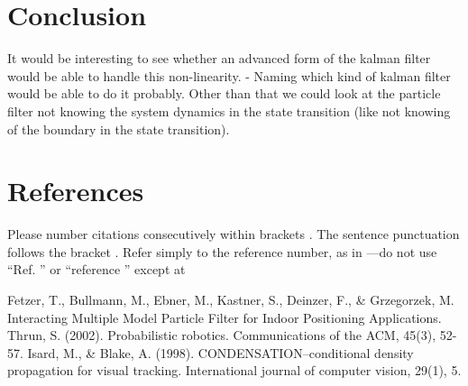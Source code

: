 \documentclass[conference]{IEEEtran}
\begin{document}
\section{Conclusion}

It would be interesting to see whether an advanced form of the kalman filter would be able to handle this non-linearity. 
- Naming which kind of kalman filter would be able to do it probably.
Other than that we could look at the particle filter not knowing the system dynamics in the state transition (like not knowing of the boundary in the state transition).




\section*{References}

Please number citations consecutively within brackets \cite{b1}. The 
sentence punctuation follows the bracket \cite{b2}. Refer simply to the reference 
number, as in \cite{b3}---do not use ``Ref. \cite{b3}'' or ``reference \cite{b3}'' except at 

\begin{thebibliography}{00} %
 Fetzer, T., Bullmann, M., Ebner, M., Kastner, S., Deinzer, F., \& Grzegorzek, M. Interacting Multiple Model Particle Filter for Indoor Positioning Applications.
 Thrun, S. (2002). Probabilistic robotics. Communications of the ACM, 45(3), 52-57. %
 Isard, M., \& Blake, A. (1998). CONDENSATION--conditional density propagation for visual tracking. International journal of computer vision, 29(1), 5.
    
\end{thebibliography}
\end{document}

